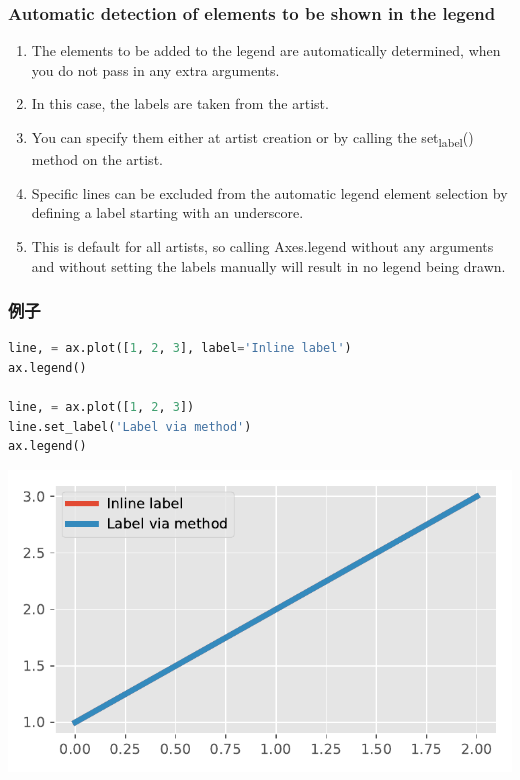 \documentclass[UTF8,a4paper,12pt]{ctexart}  %
\providecommand{\tightlist}{\setlength{\itemsep}{0pt}\setlength{\parskip}{0pt}}
\begin{document}
\hypertarget{automatic-detection-of-elements-to-be-shown-in-the-legend}{%
\subsubsection{Automatic detection of elements to be shown in the legend}\label{automatic-detection-of-elements-to-be-shown-in-the-legend}}

\begin{enumerate}
\def\labelenumi{\arabic{enumi}.}
\tightlist
\item
  The elements to be added to the legend are automatically determined,
  when you do not pass in any extra arguments.
\item
  In this case, the labels are taken from the artist.
\item
  You can specify them either at artist creation or by calling the
  set\textsubscript{label}() method on the artist.
\item
  Specific lines can be excluded from the automatic legend element
  selection by defining a label starting with an underscore.
\item
  This is default for all artists, so calling Axes.legend without any
  arguments and without setting the labels manually will result in no
  legend being drawn.
\end{enumerate}

\hypertarget{ux4f8bux5b50-7}{%
\subsubsection{例子}\label{ux4f8bux5b50-7}}

\begin{lstlisting}[language=Python]
line, = ax.plot([1, 2, 3], label='Inline label')
ax.legend()

line, = ax.plot([1, 2, 3])
line.set_label('Label via method')
ax.legend()
\end{lstlisting}

\begin{center}\includegraphics[width=0.9\linewidth]{python-visualization_files/figure-latex/unnamed-chunk-45-1} \end{center}
\end{document}
